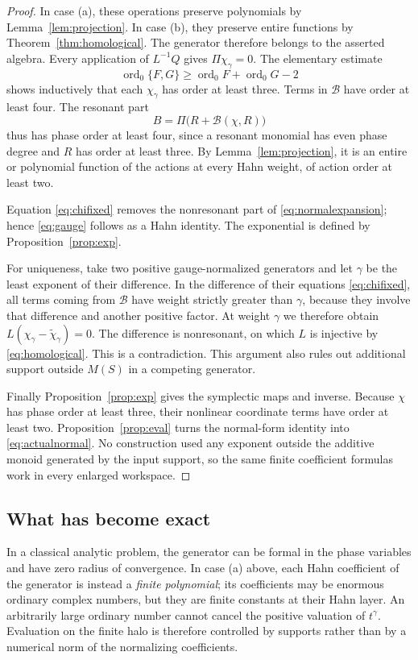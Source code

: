 \documentclass[11pt,letterpaper]{article}
\numberwithin{equation}{section}
\theoremstyle{definition}
\theoremstyle{remark}
\newcommand{\ord}{\operatorname{ord}}
\begin{document}
\begin{proof}
In case (a), these operations preserve polynomials by
Lemma~\ref{lem:projection}. In case (b), they preserve entire functions by
Theorem~\ref{thm:homological}. The generator therefore belongs to the
asserted algebra. Every application of $L^{-1}Q$ gives $\Pi\chi_\gamma=0$.
The elementary estimate
\[
 \ord_0\{F,G\}\ge\ord_0F+\ord_0G-2
\]
shows inductively that each $\chi_\gamma$ has order at least three. Terms in
$\mathcal B$ have order at least four. The resonant part
\begin{equation}\label{eq:Bnormal}
 B=\Pi\bigl(R+\mathcal B(\chi,R)\bigr)
\end{equation}
thus has phase order at least four, since a resonant monomial has even
phase degree and $R$ has order at least three. By
Lemma~\ref{lem:projection}, it is an entire or polynomial function of the
actions at every Hahn weight, of action order at least two.

Equation \eqref{eq:chifixed} removes the nonresonant part of
\eqref{eq:normalexpansion}; hence \eqref{eq:gauge} follows as a Hahn
identity. The exponential is defined by Proposition~\ref{prop:exp}.

For uniqueness, take two positive gauge-normalized generators and let
$\gamma$ be the least exponent of their difference. In the difference of
their equations \eqref{eq:chifixed}, all terms coming from $\mathcal B$
have weight strictly greater than $\gamma$, because they involve that
difference and another positive factor. At weight $\gamma$ we therefore
obtain $L(\chi_\gamma-\widetilde\chi_\gamma)=0$. The difference is
nonresonant, on which $L$ is injective by \eqref{eq:homological}. This is a
contradiction. This argument also rules out additional support outside
$M(S)$ in a competing generator.

Finally Proposition~\ref{prop:exp} gives the symplectic maps and inverse.
Because $\chi$ has phase order at least three, their nonlinear coordinate
terms have order at least two. Proposition~\ref{prop:eval} turns the
normal-form identity into \eqref{eq:actualnormal}. No construction used any
exponent outside the additive monoid generated by the input support, so the
same finite coefficient formulas work in every enlarged workspace.
\end{proof}

\subsection{What has become exact}
In a classical analytic problem, the generator can be formal in the phase
variables and have zero radius of convergence. In case (a) above, each Hahn
coefficient of the generator is instead a \emph{finite polynomial}; its
coefficients may be enormous ordinary complex numbers, but they are finite
constants at their Hahn layer. An arbitrarily large ordinary number cannot
cancel the positive valuation of $t^\gamma$. Evaluation on the finite halo
is therefore controlled by supports rather than by a numerical norm of the
normalizing coefficients.
\end{document}
